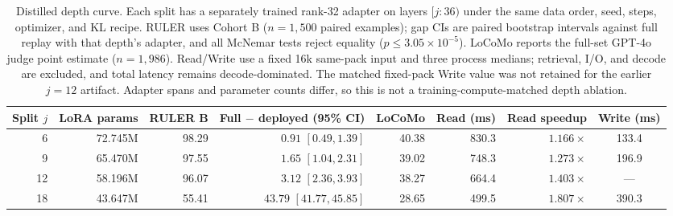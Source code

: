 \begin{table}[!tp]
\centering
\scriptsize
\setlength{\tabcolsep}{4pt}
\begin{tabular}{@{}rrrrrrrc@{}}
\toprule
\textbf{Split $j$} & \textbf{LoRA params} & \textbf{RULER B} & \textbf{Full $-$ deployed (95\% CI)} & \textbf{LoCoMo} & \textbf{Read (ms)} & \textbf{Read speedup} & \textbf{Write (ms)} \\
\midrule
6  & 72.745M & 98.29 & $0.91$ $[0.49,1.39]$ & 40.38 & 830.3 & $1.166\times$ & 133.4 \\
9  & 65.470M & 97.55 & $1.65$ $[1.04,2.31]$ & 39.02 & 748.3 & $1.273\times$ & 196.9 \\
12 & 58.196M & 96.07 & $3.12$ $[2.36,3.93]$ & 38.27 & 664.4 & $1.403\times$ & --- \\
18 & 43.647M & 55.41 & $43.79$ $[41.77,45.85]$ & 28.65 & 499.5 & $1.807\times$ & 390.3 \\
\bottomrule
\end{tabular}
\caption{Distilled depth curve. Each split has a separately trained rank-32
adapter on layers $[j{:}36)$ under the same data order, seed, steps, optimizer,
and KL recipe. RULER uses Cohort B ($n{=}1{,}500$ paired examples); gap CIs are
paired bootstrap intervals against full replay with that depth's adapter, and
all McNemar tests reject equality ($p\leq3.05\times10^{-5}$). LoCoMo reports the
full-set GPT-4o judge point estimate ($n{=}1{,}986$). Read/Write use a fixed 16k
same-pack input and three process medians; retrieval, I/O, and decode are
excluded, and total latency remains decode-dominated. The matched fixed-pack
Write value was not retained for the earlier $j{=}12$ artifact. Adapter spans
and parameter counts differ, so this is not a training-compute-matched depth
ablation.}
\label{tab:distilled-depth-curve}
\end{table}
